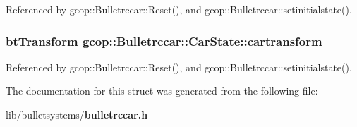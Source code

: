 \-Referenced by gcop\-::\-Bulletrccar\-::\-Reset(), and gcop\-::\-Bulletrccar\-::setinitialstate().

\subsubsection[{cartransform}]{\setlength{\rightskip}{0pt plus 5cm}bt\-Transform {\bf gcop\-::\-Bulletrccar\-::\-Car\-State\-::cartransform}}\label{structgcop_1_1Bulletrccar_1_1CarState_a59ff2b7a8d81a36d91d413e7bfa13b7c}


\-Referenced by gcop\-::\-Bulletrccar\-::\-Reset(), and gcop\-::\-Bulletrccar\-::setinitialstate().



\-The documentation for this struct was generated from the following file\-:\begin{DoxyCompactItemize}
\item 
lib/bulletsystems/{\bf bulletrccar.\-h}\end{DoxyCompactItemize}
